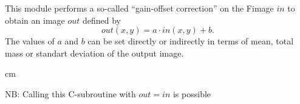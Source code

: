 
This module performs a so-called ``gain-offset correction'' on the Fimage
$in$ to obtain an image $out$ defined by 
$$out(x,y) = a \cdot in(x,y) + b.$$
The values of $a$ and $b$ can be set directly or indirectly in terms
of mean, total mass or standart deviation of the output image.

 cm

NB: Calling this C-subroutine with $out=in$ is possible
